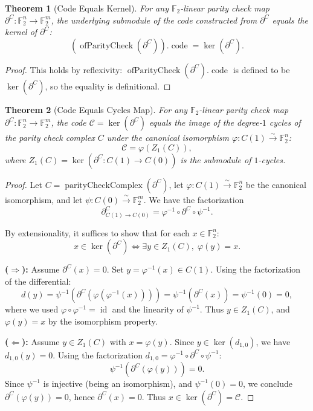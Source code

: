 \documentclass[11pt]{article}
\theoremstyle{plain}
\newtheorem*{theorem}{Theorem}
\theoremstyle{definition}
\theoremstyle{remark}
\renewcommand{\ker}{\operatorname{ker}}
\begin{document}
\begin{theorem}[Code Equals Kernel]
For any $\mathbb{F}_2$-linear parity check map $\partial^C : \mathbb{F}_2^n \to \mathbb{F}_2^m$, the underlying submodule of the code constructed from $\partial^C$ equals the kernel of $\partial^C$:
\[
(\operatorname{ofParityCheck}(\partial^C)).\operatorname{code} = \ker(\partial^C).
\]
\end{theorem}

\begin{proof}
This holds by reflexivity: $\operatorname{ofParityCheck}(\partial^C).\operatorname{code}$ is defined to be $\ker(\partial^C)$, so the equality is definitional.
\end{proof}

\begin{theorem}[Code Equals Cycles Map]
For any $\mathbb{F}_2$-linear parity check map $\partial^C : \mathbb{F}_2^n \to \mathbb{F}_2^m$, the code $\mathcal{C} = \ker(\partial^C)$ equals the image of the degree-$1$ cycles of the parity check complex $C$ under the canonical isomorphism $\varphi : C(1) \xrightarrow{\sim} \mathbb{F}_2^n$:
\[
\mathcal{C} = \varphi(Z_1(C)),
\]
where $Z_1(C) = \ker(\partial^C : C(1) \to C(0))$ is the submodule of $1$-cycles.
\end{theorem}

\begin{proof}
Let $C = \operatorname{parityCheckComplex}(\partial^C)$, let $\varphi : C(1) \xrightarrow{\sim} \mathbb{F}_2^n$ be the canonical isomorphism, and let $\psi : C(0) \xrightarrow{\sim} \mathbb{F}_2^m$. We have the factorization
\[
\partial^C_{C(1) \to C(0)} = \varphi^{-1} \circ \partial^C \circ \psi^{-1}.
\]

By extensionality, it suffices to show that for each $x \in \mathbb{F}_2^n$:
\[
x \in \ker(\partial^C) \Longleftrightarrow \exists y \in Z_1(C), \; \varphi(y) = x.
\]

\textbf{($\Rightarrow$):} Assume $\partial^C(x) = 0$. Set $y = \varphi^{-1}(x) \in C(1)$. Using the factorization of the differential:
\[
d(y) = \psi^{-1}(\partial^C(\varphi(\varphi^{-1}(x)))) = \psi^{-1}(\partial^C(x)) = \psi^{-1}(0) = 0,
\]
where we used $\varphi \circ \varphi^{-1} = \operatorname{id}$ and the linearity of $\psi^{-1}$. Thus $y \in Z_1(C)$, and $\varphi(y) = x$ by the isomorphism property.

\textbf{($\Leftarrow$):} Assume $y \in Z_1(C)$ with $x = \varphi(y)$. Since $y \in \ker(d_{1,0})$, we have $d_{1,0}(y) = 0$. Using the factorization $d_{1,0} = \varphi^{-1} \circ \partial^C \circ \psi^{-1}$:
\[
\psi^{-1}(\partial^C(\varphi(y))) = 0.
\]
Since $\psi^{-1}$ is injective (being an isomorphism), and $\psi^{-1}(0) = 0$, we conclude $\partial^C(\varphi(y)) = 0$, hence $\partial^C(x) = 0$. Thus $x \in \ker(\partial^C) = \mathcal{C}$.
\end{proof}
\end{document}
